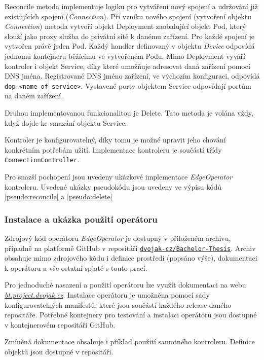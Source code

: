 Reconcile metoda implementuje logiku pro vytváření nový spojení a udržování již existujících spojení (\textit{Connection}). Při vzniku nového spojení (vytvoření objektu \textit{Connection}) metoda vytvoří objekt Deployment zaobalující objekt Pod, který slouží jako proxy služba do privátní sítě k danému zařízení. Pro každé spojení je vytvořen právě jeden Pod. Každý handler definovaný v objektu \textit{Device} odpovídá jednomu kontejneru běžícímu ve vytvořeném Podu. Mimo Deployment vyváří kontroler i objekt Service, díky které umožňuje adresovat daná zařízení pomocí DNS jména. Registrované DNS jméno zařízení, ve výchozím konfiguraci, odpovídá \verb|dop-<name_of_service>|. Vystavené porty objektem Service odpovídají portům na daném zařízení. 

Druhou implementovanou funkcionalitou je Delete. Tato metoda je volána vždy, když dojde ke smazání objektu Service.

Kontroler je konfigurovatelný, díky tomu je možné upravit jeho chování konkrétním potřebám užití. Implementace kontroleru je součástí třídy \verb|ConnectionController|. 

Pro snazší pochopení jsou uvedeny ukázkové implementace \textit{EdgeOperator} kontroleru. Uvedené ukázky pseudokódu jsou uvedeny ve výpisu kódů \ref{pseudo:reconcile} a \ref{pseudo:delete}




\subsubsection*{Instalace a ukázka použití operátoru}
Zdrojový kód operátoru \textit{EdgeOperator} je dostupný v přiloženém archivu, případně na platformě GitHub v repositáři \href{https://github.com/dvojak-cz/Bachelor-Thesis}{\texttt{dvojak-cz/Bachelor-Thesis}}. Archiv obsahuje mimo zdrojového kódu i definice prostředí (popsáno výše), dokumentaci k operátoru a vše ostatní spjaté s touto prací.

Pro jednoduché nasazení a použití operátoru lze využít dokumentaci na webu\\\href{https://bt.project.dvojak.cz/}{\textit{bt.project.dvojak.cz}}. Instalace operátoru je umožněna pomocí sady konfigurovatelných manifestů, které jsou součástí každého release daného repositáře. Potřebné kontejnery pro testování a instalaci operátoru jsou dostupné v kontejnerovém repositáři GitHub.

Zmíněná dokumentace obsahuje i příklad použití samotného kontroleru. Definice objektů jsou dostupné v repositáři.  

